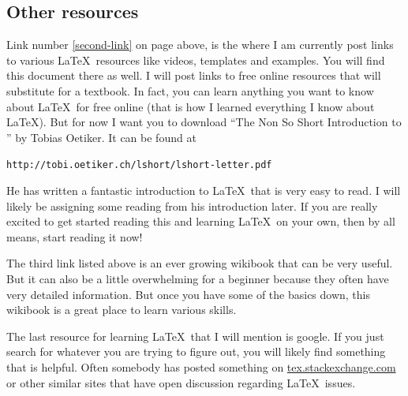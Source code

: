 \documentclass[11pt]{article}
\begin{document}
\subsection{Other resources}
Link number \ref{second-link} on page \pageref{important-links} above, is the where I am currently post links to various \LaTeX\ resources like videos, templates and examples. You will find this document there as well. I will post links to free online resources that will substitute for a textbook.  In fact, you can learn anything you want to know about \LaTeX\ for free online (that is how I learned everything I know about \LaTeX). But for now I want you to download ``The Non So Short Introduction to \LaTeXe'' by Tobias Oetiker. It can be found at 
\begin{center}
\verb|http://tobi.oetiker.ch/lshort/lshort-letter.pdf|
\end{center}
He has written a fantastic introduction to \LaTeX\ that is very easy to read.  I will likely be assigning some reading from his introduction later.  If you are really excited to get started reading this and learning \LaTeX\ on your own, then by all means, start reading it now!

The third link listed above is an ever growing wikibook that can be very useful.  But it can also be a little overwhelming for a beginner because they often have very detailed information.  But once you have some of the basics down, this wikibook is a great place to learn various skills.  

The last resource for learning \LaTeX\ that I will mention is google.  If you just search for whatever you are trying to figure out, you will likely find something that is helpful. Often somebody has posted something on \href{http://tex.stackexchange.com}{tex.stackexchange.com} or other similar sites that have open discussion regarding \LaTeX\ issues.
\end{document}
